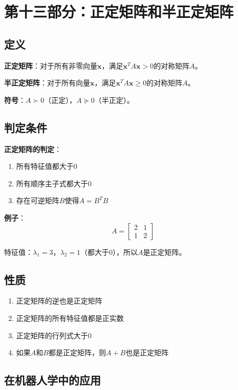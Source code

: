 \documentclass[12pt,a4paper]{article}
\begin{document}
\section{第十三部分：正定矩阵和半正定矩阵}

\subsection{定义}

\textbf{正定矩阵}：对于所有非零向量$\bm{x}$，满足$\bm{x}^T A \bm{x} > 0$的对称矩阵$A$。

\textbf{半正定矩阵}：对于所有向量$\bm{x}$，满足$\bm{x}^T A \bm{x} \geq 0$的对称矩阵$A$。

\textbf{符号}：$A \succ 0$（正定），$A \succeq 0$（半正定）。

\subsection{判定条件}

\textbf{正定矩阵的判定}：
\begin{enumerate}
\item 所有特征值都大于0
\item 所有顺序主子式都大于0
\item 存在可逆矩阵$B$使得$A = B^T B$
\end{enumerate}

\textbf{例子}：
\begin{equation}
A = \begin{bmatrix} 2 & 1 \\ 1 & 2 \end{bmatrix}
\end{equation}

特征值：$\lambda_1 = 3$，$\lambda_2 = 1$（都大于0），所以$A$是正定矩阵。

\subsection{性质}

\begin{enumerate}
\item 正定矩阵的逆也是正定矩阵
\item 正定矩阵的所有特征值都是正实数
\item 正定矩阵的行列式大于0
\item 如果$A$和$B$都是正定矩阵，则$A + B$也是正定矩阵
\end{enumerate}

\subsection{在机器人学中的应用}
\end{document}
